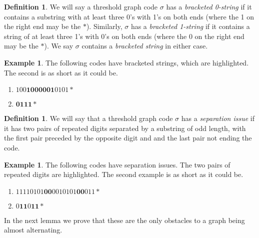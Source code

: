 \documentclass[12pt]{amsart}
\theoremstyle{plain}
\theoremstyle{definition}
\newtheorem{defi}[thm]{Definition}
\newtheorem{ex}[thm]{Example}
\begin{document}
\begin{defi}
We will say a threshold graph code $\sigma$ has a \emph{bracketed 0-string} if it contains a substring with at least three 0's with 1's on both ends (where the 1 on the right end may be the $*$).  Similarly, $\sigma$ has a \emph{bracketed 1-string} if it contains a string of at least three 1's with 0's on both ends (where the $0$ on the right end may be the $*$).  We say $\sigma$ contains a \emph{bracketed string} in either case.
\end{defi}

\begin{ex}
The following codes have bracketed strings, which are highlighted.  The second is as short as it could be.
\begin{enumerate}
\item $100\mathbf{1000001}0101*$
\item $\mathbf{0111*}$
\end{enumerate}
\end{ex}

\begin{defi} We will say that a threshold graph code $\sigma$ has a \emph{separation issue} if it has two pairs of repeated digits separated by a  substring of odd length, with the first pair preceded by the opposite digit and and the last pair not ending the code.
\end{defi}

\begin{ex}  The following codes have separation issues. The two pairs of repeated digits are highlighted. The second example is as short as it could be.
\begin{enumerate}
\item $ 11110101\mathbf{00}0010101\mathbf{00}011*$
\item  $0\mathbf{11}0\mathbf{11}*$
\end{enumerate}

\end{ex}

In the next lemma we prove that these are the only obstacles to a graph being almost alternating.
\end{document}

